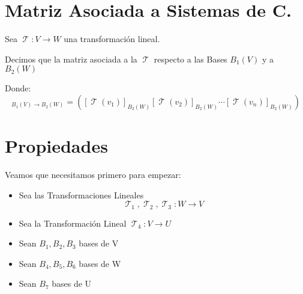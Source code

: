 \documentclass[12pt]{report}                                    %
\DeclareMathOperator \LinealTransformation {\mathcal{T}}
\begin{document}
    \clearpage
    \section{Matriz Asociada a Sistemas de C.}
        Sea $\LinealTransformation : V \to W $ una transformación lineal.
        
        Decimos que la matriz asociada a la $\LinealTransformation$ respecto a las Bases 
        $B_{1}(V)$ y a $B_{2}(W)$

        Donde:
        \begin{equation*}
            [\LinealTransformation]_{B_{1}(V) \to B_{2}(W)} = 
            \left(
                [\LinealTransformation(v_1)]_{B_{2}(W)}
                [\LinealTransformation(v_2)]_{B_{2}(W)}
                \cdots
                [\LinealTransformation(v_n)]_{B_{2}(W)}
            \right)
        \end{equation*}


        \clearpage
        \section{Propiedades}

            Veamos que necesitamos primero para empezar:
            
            \begin{itemize}
                \item Sea las Transformaciones Lineales 
                    \begin{equation*}
                        \LinealTransformation_1,
                        \LinealTransformation_2,
                        \LinealTransformation_3 : W \to V
                    \end{equation*}

                \item Sea la Transformación Lineal $\LinealTransformation_4: V \to U$
                
                \item Sean $B_1, B_2, B_3$ bases de V
                
                \item Sean $B_4, B_5, B_6$ bases de W
                
                \item Sean $B_7$ bases de U
            \end{itemize}
\end{document}
